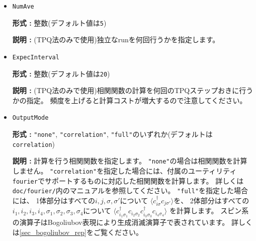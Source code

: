 \begin{itemize}
%
%
%

\item \verb|NumAve|

{\bf 形式 :} 整数(デフォルト値は\verb|5|)

{\bf 説明 :} (TPQ法のみで使用)独立なrunを何回行うかを指定します。

\item \verb|ExpecInterval|

{\bf 形式 :} 整数(デフォルト値は\verb|20|)

{\bf 説明 :} (TPQ法のみで使用)相関関数の計算を何回のTPQステップおきに行うかの指定。
頻度を上げると計算コストが増大するので注意してください。

\item \verb|OutputMode|

{\bf 形式 :} \verb|"none"|, \verb|"correlation"|, \verb|"full"|のいずれか(デフォルトは\verb|correlation|)

{\bf 説明 :} 計算を行う相関関数を指定します。
\verb|"none"|の場合は相関関数を計算しません。
\verb|"correlation"|を指定した場合には、付属のユーティリティ
\verb|fourier|でサポートするものに対応した相関関数を計算します。
詳しくは\verb|doc/fourier/|内のマニュアルを参照してください。
\verb|"full"|を指定した場合には、
1体部分はすべての$i, j, \sigma, \sigma'$について
$\langle c_{i \sigma}^{\dagger}c_{j \sigma'} \rangle$を、
2体部分はすべての$i_1, i_2, i_3, i_4, \sigma_1, \sigma_2, \sigma_3, \sigma_4$について
$\langle c_{i_1 \sigma_1}^{\dagger}c_{i_2 \sigma_2} c_{i_3 \sigma_3}^{\dagger}c_{i_4 \sigma_4} \rangle$
を計算します。
スピン系の演算子はBogoliubov表現により生成消滅演算子で表されています。
詳しくは\ref{sec_bogoliubov_rep}をご覧ください。


\end{itemize}
